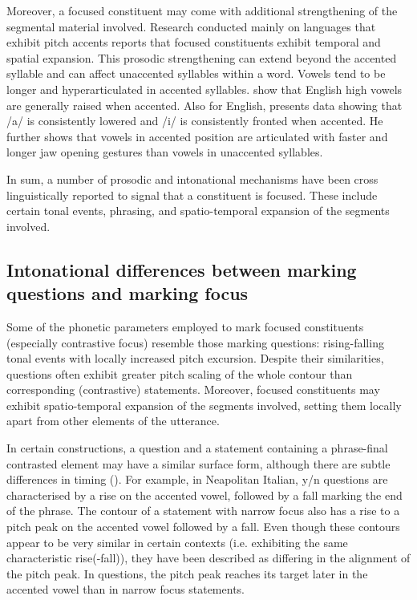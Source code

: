 Moreover, a focused constituent may come with additional strengthening of the segmental material involved. Research conducted mainly on languages that exhibit pitch accents reports that focused constituents exhibit temporal and spatial expansion. This prosodic strengthening can extend beyond the accented syllable and can affect unaccented syllables within a word. Vowels tend to be longer and hyperarticulated in accented syllables. \citet{Harrington.etal2000} show that English high vowels are generally raised when accented. Also for English, \citet{Cho2005} presents data showing that /a/ is consistently lowered and /i/ is consistently fronted when accented. He further shows that vowels in accented position are articulated with faster and longer jaw opening gestures than vowels in unaccented syllables.  

In sum, a number of prosodic and intonational mechanisms have been cross linguistically reported to signal that a constituent is focused. These include certain tonal events, phrasing, and spatio-temporal expansion of the segments involved.

\subsection{Intonational differences between marking questions and marking focus}
Some of the phonetic parameters employed to mark focused constituents (especially contrastive focus) resemble those marking questions: rising-falling tonal events with locally increased pitch excursion. Despite their similarities, questions often exhibit greater pitch scaling of the whole contour than corresponding (contrastive) statements. Moreover, focused constituents may exhibit spatio-temporal expansion of the segments involved, setting them locally apart from other elements of the utterance.

In certain constructions, a question and a statement containing a phrase-final contrasted element may have a similar surface form, although there are subtle differences in timing (\citealt{GosyTerken1994,DimperioHouse1997,Makarova2007}). For example, in Neapolitan Italian, y/n questions are characterised by a rise on the accented vowel, followed by a fall marking the end of the phrase. The contour of a statement with narrow focus also has a rise to a pitch peak on the accented vowel followed by a fall. Even though these contours appear to be very similar in certain contexts (i.e. exhibiting the same characteristic rise(-fall)), they have been described as differing in the alignment of the pitch peak. In questions, the pitch peak reaches its target later in the accented vowel than in narrow focus statements.

